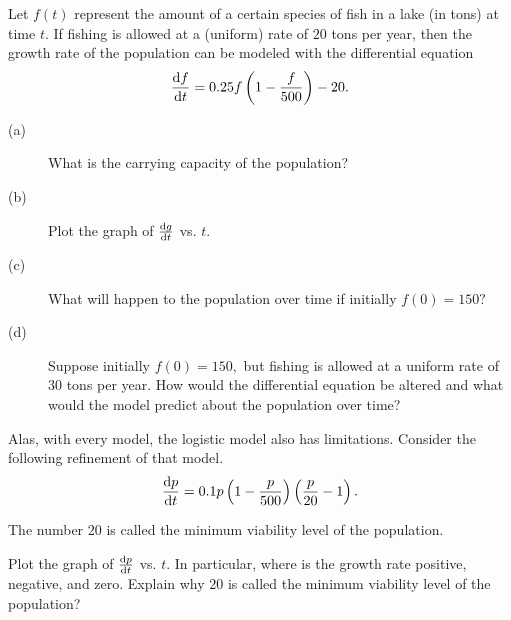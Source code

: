 \begin{embeddedproblem}{}
  Let $f(t)$ represent the amount of a certain
  species of fish in a lake (in tons) at time $t.$  If fishing is
  allowed at a (uniform) rate of $20$ tons per year, then the growth
  rate of the population can be modeled with the differential equation
$$
\frac{\text{d}{f}}{\text{d}{t}}=0.25f\left(1-\frac{f}{500}\right)-20.
$$
\begin{description}
\item[(a)] What is the carrying capacity of the population?
\item[(b)] Plot the graph of $\frac{\text{d}{g}}{\text{d}{t}}$ vs. $t.$
\item[(c)] What will happen to the population over time if initially
  $f(0)=150?$
\item[(d)] Suppose initially $f(0)=150,$ but fishing is allowed at a
  uniform rate of $30$ tons per year.  How would the differential
  equation be altered and what would the model predict about the
  population over time?
\end{description}

  Alas, with every model, the logistic model also has limitations.
  Consider the following refinement of that model.
$$
\frac{\text{d}{p}}{\text{d}{t}} = 0.1p\left(1-\frac{p}{500}\right)\left(\frac{
p}{20}-1\right).
$$

  The number $20$ is called the minimum viability level of the
  population.
\end{embeddedproblem}

\begin{embeddedproblem}
  Plot the graph of $\frac{\text{d}{p}}{\text{d}{t}}$ vs. $t.$  In
  particular, where is the growth rate positive, negative, and zero.
  Explain why $20$ is called the minimum viability level of the
  population?
\end{embeddedproblem}

